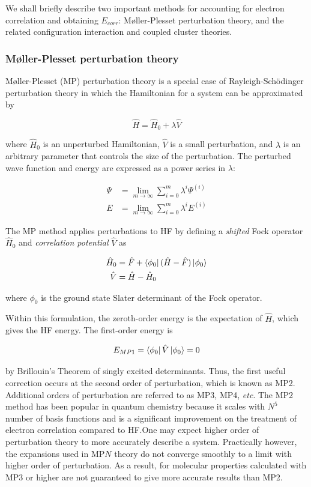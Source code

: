 We shall briefly describe two important methods for accounting for electron
correlation and obtaining $E_{corr}$: M{\o}ller-Plesset perturbation theory,
and the related configuration interaction and coupled cluster theories.

\subsubsection{M{\o}ller-Plesset perturbation theory}

M{\o}ller-Plesset (MP) perturbation theory is a special case of
Rayleigh-Sch{\"o}dinger perturbation theory in which the Hamiltonian for a
system can be approximated by

\begin{equation}
  \hat{H} = \hat{H}_0 + \lambda\hat{V}
\end{equation}

\noindent where $\hat{H}_0$ is an unperturbed Hamiltonian, $\hat{V}$ is a small
perturbation, and $\lambda$ is an arbitrary parameter that controls the size
of the perturbation. The perturbed wave function and energy are expressed as a
power series in $\lambda$:

\begin{align}
 \Psi &= \lim_{m\to\infty} \sum_{i=0}^{m} \lambda^i \Psi^{(i)} \\
  E &= \lim_{m\to\infty} \sum_{i=0}^{m} \lambda^i E^{(i)}
\end{align}

The MP method applies perturbations to HF by defining a \emph{shifted} Fock
operator $\hat{H}_0$ and \emph{correlation potential} $\hat{V}$ as

\begin{align}
  \hat{H}_0 &= \hat{F} + \bra{\phi_0}(\hat{H}-\hat{F})\ket{\phi_0} \\
  \hat{V}   &= \hat{H} - \hat{H}_0
\end{align}

\noindent where $\phi_0$ is the ground state Slater determinant of the Fock
operator.

Within this formulation, the zeroth-order energy is the expectation of
$\hat{H}$, which gives the HF energy. The first-order energy is

\begin{equation}
  E_{MP1} = \bra{\phi_0}\hat{V}\ket{\phi_0} = 0
\end{equation}

\noindent by Brillouin's Theorem of singly excited determinants. Thus, the
first useful correction occurs at the second order of perturbation, which is
known as MP2. Additional orders of perturbation are referred to as MP3, MP4,
\emph{etc}. The MP2 method has been popular in quantum chemistry because it
scales with $N^5$ number of basis functions and is a significant improvement on
the treatment of electron correlation compared to HF.\@ One may expect higher
order of perturbation theory to more accurately describe a system. Practically
however, the expansions used in MP$N$ theory do not converge smoothly to a
limit with higher order of perturbation.\cite{Leininger2000} As a result, for
molecular properties calculated with MP3 or higher are not guaranteed to give
more accurate results than MP2.

